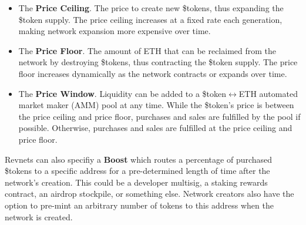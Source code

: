 \documentclass{article}
\begin{document}
\begin{itemize}
  \item The \textbf{Price Ceiling}. The price to create new \$tokens, thus expanding the \$token supply. The price ceiling increases at a fixed rate each generation, making network expansion more expensive over time.
  \item The \textbf{Price Floor}. The amount of ETH that can be reclaimed from the network by destroying \$tokens, thus contracting the \$token supply. The price floor increases dynamically as the network contracts or expands over time.
  \item The \textbf{Price Window}. Liquidity can be added to a \$token$\leftrightarrow$ETH automated market maker (AMM) pool at any time. While the \$token's price is between the price ceiling and price floor, purchases and sales are fulfilled by the pool if possible. Otherwise, purchases and sales are fulfilled at the price ceiling and price floor.
\end{itemize}

Revnets can also specifiy a \textbf{Boost} which routes a percentage of purchased \$tokens to a specific address for a pre-determined length of time after the network's creation. This could be a developer multisig, a staking rewards contract, an airdrop stockpile, or something else. Network creators also have the option to pre-mint an arbitrary number of tokens to this address when the network is created.

\end{document}
